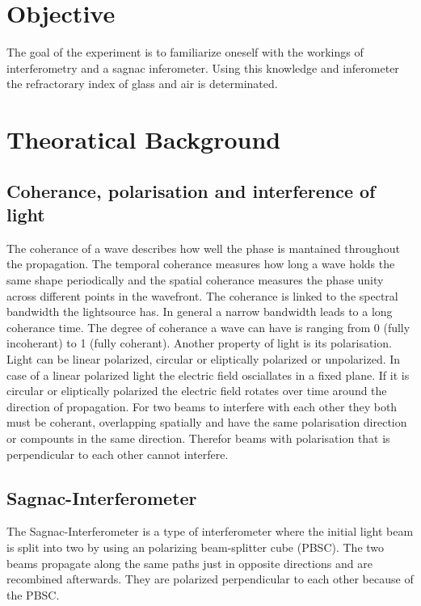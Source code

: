 \section{Objective}
\label{sec:Objective}
The goal of the experiment is to familiarize oneself with the workings of interferometry and a sagnac 
inferometer. Using this knowledge and inferometer the refractorary index of glass and air is determinated. 
\section{Theoratical Background}
\label{sec:Theorie}
\subsection{Coherance, polarisation  and interference of light}
The coherance of a wave describes how well the phase is mantained throughout the propagation. The temporal coherance measures how long a 
wave holds the same shape periodically and the spatial coherance measures the phase unity across different points in the wavefront.
The coherance is linked to the spectral bandwidth the lightsource has. In general a narrow bandwidth leads to a long coherance time.
The degree of coherance a wave can have is ranging from 0 (fully incoherant) to 1 (fully coherant). 
Another property of light is its polarisation. Light can be linear polarized, circular or eliptically polarized or unpolarized. 
In case of a linear polarized light the electric field osciallates in a fixed plane. If it is circular or eliptically polarized the 
electric field rotates over time around the direction of propagation. 
For two beams to interfere with each other they both must be coherant, overlapping spatially and have the same polarisation direction or
compounts in the same direction. Therefor beams with polarisation that is perpendicular to each other cannot interfere. 

\subsection{Sagnac-Interferometer}
\label{subsec:Sagnac_Interferometer}
The Sagnac-Interferometer is a type of interferometer where the initial light beam is split into two by using an polarizing beam-splitter 
cube (PBSC). The two beams propagate along the same paths just in opposite directions and are recombined afterwards. They are polarized 
perpendicular to each other because of the PBSC.

